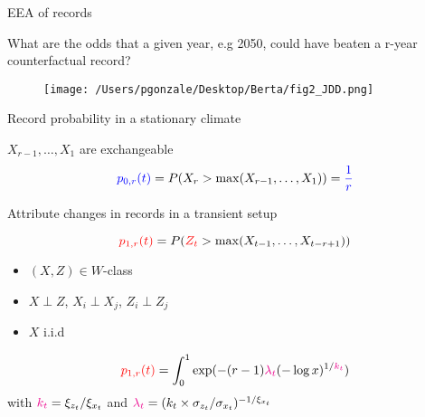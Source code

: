 \documentclass[9pt,compress]{beamer}
\begin{document}
\begin{frame}{EEA of records}
\begin{tcolorbox}[title= Question ]
What are the odds that a given year, e.g 2050, could have beaten a r-year counterfactual record?
\end{tcolorbox}

\begin{figure}
\centering
\texttt{[image: /Users/pgonzale/Desktop/Berta/fig2\_JDD.png]}
\end{figure}
\end{frame}
%
%
%
\begin{frame}{Record probability in a stationary climate \footnotemark[9]}
\begin{tcolorbox}[title= Record probability in the counterfactual world ]
$X_{r-1}, \dots, X_1$ are exchangeable 
$${\color{blue}p_{0,r}(t)} = P(X_r> \max (X_{r-1},\dots, X_{1})) = {\color{blue} \frac{1}{r} }$$
\end{tcolorbox}
\end{frame}
%
%
%
\begin{frame}{Attribute changes in records in a transient setup}
\begin{tcolorbox}[title= Inferential objective ]
$${\color{red}p_{1,r}(t)} = P({\color{red}Z_t}> \max (X_{t-1},\dots, X_{t-r+1}))$$ 
\end{tcolorbox}
\begin{tcolorbox}[title= Assumptions ]
\begin{itemize}
	\item $(X,Z)\in W$-class
	\item $X\perp Z$, $X_i\perp X_j$, $Z_i\perp Z_j$
	\item $X$ i.i.d
\end{itemize}
\end{tcolorbox}
\pause
\begin{tcolorbox}[title= Record probability under W-class]
$${\color{red}p_{1,r}(t)} = \int_0^1\exp(-(r-1){\color{magenta}\lambda_t}(-\log x)^{1/{\color{magenta}k_t}})$$ 
\centering
with ${\color{magenta}k_t} = \xi_{z_t}/\xi_{x_t}$ and ${\color{magenta}\lambda_t} = (k_t \times \sigma_{z_t}/\sigma_{x_t})^{-1/\xi_{x_t}}$
\end{tcolorbox}
\end{frame}
\end{document}

